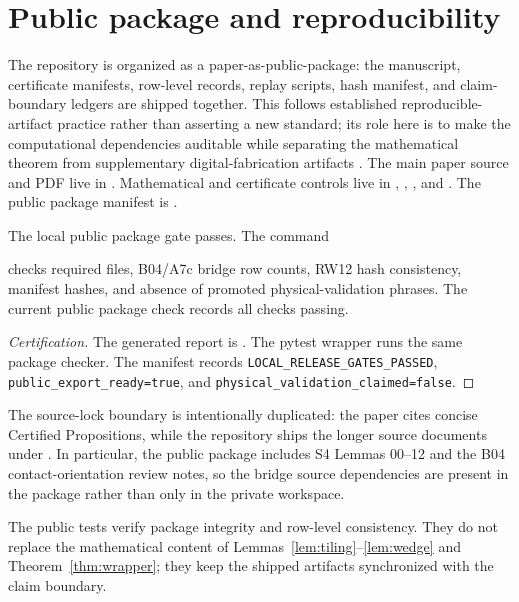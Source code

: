 ﻿\section{Public package and reproducibility}
\label{sec:package}

The repository is organized as a paper-as-public-package: the manuscript,
certificate manifests, row-level records, replay scripts, hash manifest, and
claim-boundary ledgers are shipped together.  This follows established
reproducible-artifact practice rather than asserting a new standard; its role
here is to make the computational dependencies auditable while separating the
mathematical theorem from supplementary digital-fabrication artifacts
\cite{smith2017joss,rougier2017rescience}.  The main paper source and PDF live
in .  Mathematical and certificate controls live in
, , , and .  The
public package manifest is .

\begin{certprop}
The local public package gate passes.  The command
\begin{center}
\end{center}
checks required files, B04/A7c bridge row counts, RW12 hash consistency,
manifest hashes, and absence of promoted physical-validation phrases.  The
current public package check records all checks passing.
\end{certprop}

\begin{proof}[Certification]
The generated report is .  The pytest
wrapper  runs the same package checker.  The
manifest records \texttt{LOCAL\_RELEASE\_GATES\_PASSED},
\texttt{public\_export\_ready=true}, and
\texttt{physical\_validation\_claimed=false}.
\end{proof}

The source-lock boundary is intentionally duplicated: the paper cites concise
Certified Propositions, while the repository ships the longer source documents
under .  In particular, the public package includes
S4 Lemmas 00--12 and the B04 contact-orientation review notes, so the bridge
source dependencies are present in the package rather than only in the private
workspace.

\begin{remark}
The public tests verify package integrity and row-level consistency.  They do
not replace the mathematical content of Lemmas~\ref{lem:tiling}--\ref{lem:wedge}
and Theorem~\ref{thm:wrapper}; they keep the shipped artifacts synchronized with
the claim boundary.
\end{remark}
